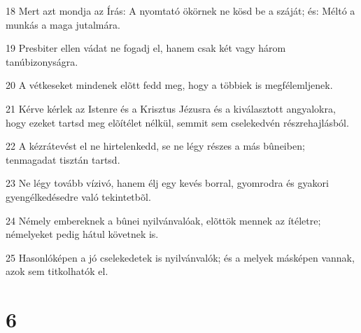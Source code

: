 \par 18 Mert azt mondja az Írás: A nyomtató ökörnek ne kösd be a száját; és: Méltó a munkás  a maga jutalmára.
\par 19 Presbiter ellen vádat ne fogadj el, hanem csak két vagy három tanúbizonyságra.
\par 20 A vétkeseket mindenek elõtt fedd meg, hogy a többiek is megfélemljenek.
\par 21 Kérve kérlek az Istenre és a Krisztus Jézusra és a kiválasztott angyalokra, hogy ezeket tartsd meg elõítélet nélkül, semmit sem cselekedvén részrehajlásból.
\par 22 A kézrátevést el ne hirtelenkedd, se ne légy részes a más bûneiben; tenmagadat tisztán tartsd.
\par 23 Ne légy tovább vízivó, hanem élj egy kevés borral, gyomrodra és gyakori gyengélkedésedre való tekintetbõl.
\par 24 Némely embereknek a bûnei nyilvánvalóak, elõttök mennek az ítéletre; némelyeket pedig hátul követnek is.
\par 25 Hasonlóképen a jó cselekedetek is nyilvánvalók; és a melyek másképen vannak, azok sem titkolhatók el.

\chapter{6}

